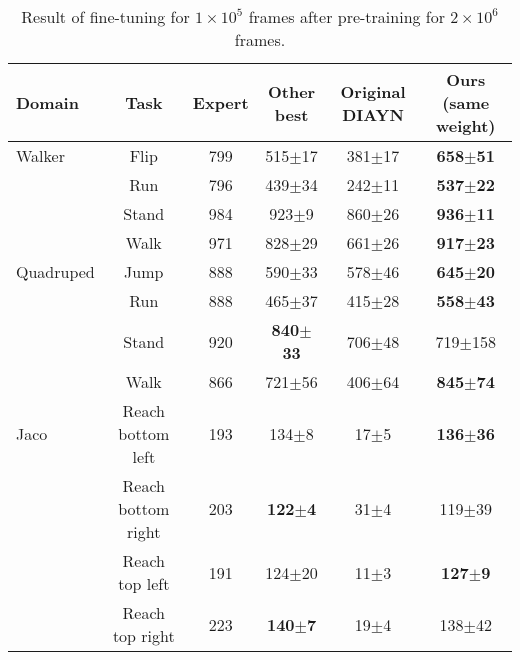 \documentclass[nohyperref]{article}
\theoremstyle{plain}
\theoremstyle{definition}
\theoremstyle{remark}
\begin{document}
\begin{table*}[t]
    \caption{Result of fine-tuning for $1 \times 10^5$ frames after pre-training for $2 \times 10^6$ frames.}
    \label{table:result_urlb}
    \vskip 0.15in
    \begin{center}
    \begin{small}
    \begin{sc}
    \begin{tabular}{lccccc}
    \toprule
    Domain & Task & Expert & Other best & Original DIAYN & Ours (same weight) \\
    \midrule
    Walker & Flip  & 799  & 515$\pm$17 &  381$\pm$17   & \textbf{658$\pm$51}\\
           & Run   & 796  & 439$\pm$34 &  242$\pm$11   & \textbf{537$\pm$22}\\
           & Stand & 984  & 923$\pm$9  &  860$\pm$26   & \textbf{936$\pm$11} \\
           & Walk  & 971  & 828$\pm$29 &  661$\pm$26   & \textbf{917$\pm$23}\\
    Quadruped & Jump  & 888  & 590$\pm$33  &  578$\pm$46  & \textbf{645$\pm$20} \\
           & Run   & 888     & 465$\pm$37  &  415$\pm$28  & \textbf{558$\pm$43} \\
           & Stand & 920     & \textbf{840$\pm$33}  &  706$\pm$48  & 719$\pm$158 \\
           & Walk  & 866     & 721$\pm$56  &  406$\pm$64  & \textbf{845$\pm$74}  \\
    Jaco & Reach bottom left   & 193 & 134$\pm$8 & 17$\pm$5   & \textbf{136$\pm$36}\\
           & Reach bottom right& 203 & \textbf{122$\pm$4} & 31$\pm$4   & 119$\pm$39\\
           & Reach top left    & 191 & 124$\pm$20 & 11$\pm$3   & \textbf{127$\pm$9}\\
           & Reach top right   & 223 & \textbf{140$\pm$7}  & 19$\pm$4   & 138$\pm$42\\
    \bottomrule
    \end{tabular}
    \end{sc}
    \end{small}
    \end{center}
    \vskip -0.1in
    \end{table*}
\end{document}
